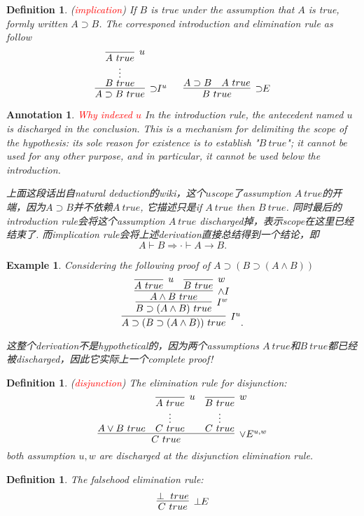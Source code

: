 \documentclass{article}
\theoremstyle{plain}
\newtheorem{example}[theorem]{Example}
\newtheorem{definition}[theorem]{Definition}
\newtheorem{annotation}[theorem]{Annotation}
\theoremstyle{nonumberplain}
\newcommand{\redt}[1]{\textcolor{red}{#1}}
\begin{document}
\begin{definition}
\rm (\redt{implication}) If $B$ is true under the assumption that $A$ is true, formly written $A \supset B$. The corresponed introduction and elimination rule as follow \[\infer[\supset\!\!I^u]{A \supset B~true}{\deduce[\vdots]{B~true}{\infer[u]{A~true}{}}}~~~~~ \infer[\supset\!\!E]{B~true}{A\supset B & A~true}\]
\end{definition}

\begin{annotation}
\rm \redt{Why indexed $u$} In the introduction rule, the antecedent named $u$ is discharged in the conclusion. This is a mechanism for delimiting the scope of the hypothesis: its sole reason for existence is to establish "$B~true$"; it cannot be used for any other purpose, and in particular, it cannot be used below the introduction.

上面这段话出自natural deduction的wiki，这个$u$scope了assumption $A~true$的开端，因为$A\supset B$并不依赖$A~true$, 它描述只是if $A~true$ then $B~true$. 
同时最后的introduction rule会将这个assumption $A~true$ discharged掉，表示scope在这里已经结束了. 而implication rule会将上述derivation直接总结得到一个结论，即
$$
A \vdash B \Rightarrow \cdot\vdash A \to B. 
$$
\end{annotation}

\begin{example}
\rm Considering the following proof of $A \supset (B \supset (A \wedge B))$
$$
\infer[I^u]{A \supset (B \supset (A \wedge B))~true}{\infer[I^w]{B \supset (A \wedge B)~true}{\infer[\wedge I]{A \wedge B~true}{\infer[u]{A~true}{} & \infer[w]{B~true}{}}}}.
$$

这整个derivation不是hypothetical的，因为两个assumptions $A~true$和$B~true$都已经被discharged，因此它实际上一个complete proof! 
\end{example}

\begin{definition}
\rm (\redt{disjunction}) The elimination rule for disjunction:
$$
\infer[\vee E^{u,w}]{C~true}{A \vee B ~true & \deduce[\vdots]{C~true}{\infer[u]{A~true}{}} & \deduce[\vdots]{C~true}{\infer[w]{B~true}{}}}
$$
both assumption $u,w$ are discharged at the disjunction elimination rule. 
\end{definition}


\begin{definition}
\rm The falsehood elimination rule:
$$
\infer[\perp\!\!E]{C~true}{\perp~true}
$$
\end{definition}
\end{document}
